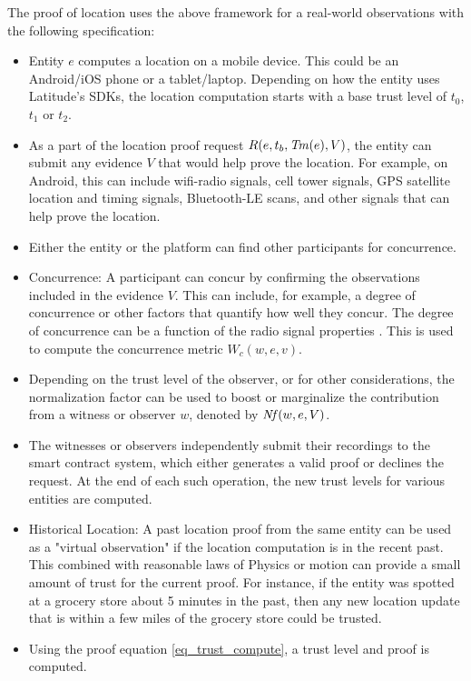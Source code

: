 The proof of location uses the above framework for a real-world observations with the following specification:
\begin{itemize}
    \item Entity $e$ computes a location on a mobile device. This could be an Android/iOS phone or a tablet/laptop.
        Depending on how the entity uses Latitude's SDKs, the location computation starts with a base trust level of
        $t_0$, $t_1$ or $t_2$.
    \item As a part of the location proof request $R(e, t_b, \mathit{Tm}(e), V)$, the entity can submit any evidence $V$ that would help
        prove the location. For example, on Android, this can include wifi-radio signals, cell tower signals, GPS
        satellite location and timing signals, Bluetooth-LE scans, and other signals that can help prove the location.
    \item Either the entity or the platform can find other participants for concurrence.
    \item Concurrence: A participant can concur by confirming the observations included in the evidence $V$. This can
        include, for example, a degree of concurrence or other factors that quantify how well they concur. The degree of
        concurrence can be a function of the radio signal properties \cite{mishra_secure, Mathur_2011}. This is used to
        compute the concurrence metric $W_c(w, e, v)$.
    \item Depending on the trust level of the observer, or for other considerations, the normalization factor can be
        used to boost or marginalize the contribution from a witness or observer $w$, denoted by $\mathit{Nf}(w, e, V)$.
    \item The witnesses or observers independently submit their recordings to the smart contract system, which either
        generates a valid proof or declines the request. At the end of each such operation, the new trust levels for
        various entities are computed.
    \item Historical Location: A past location proof from the same entity can be used as a "virtual observation" if the
        location computation is in the recent past. This combined with reasonable laws of Physics or motion can provide
        a small amount of trust for the current proof. For instance, if the entity was spotted at a grocery store about
        5 minutes in the past, then any new location update that is within a few miles of the grocery store could be trusted.
    \item Using the proof equation \ref{eq_trust_compute}, a trust level and proof is computed.
\end{itemize}

